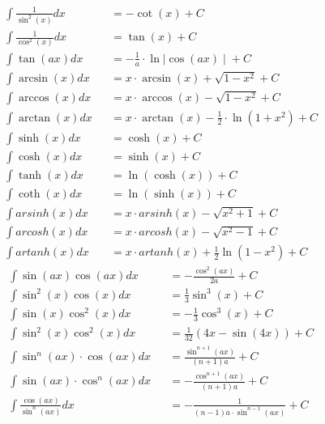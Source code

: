 \begin{small}
\begin{align*}
         & \int \frac{1}{\sin^2(x)}dx     &  & = -\cot(x)+C                                                    \\
         & \int \frac{1}{\cos^2(x)}dx     &  & = \tan(x)+C                                                     \\
         & \int \tan(ax) dx               &  & = -\frac{1}{a} \cdot \ln{\mid \cos(ax) \mid }+C                 \\
         & \int \arcsin (x) dx            &  & = x \cdot \arcsin(x)+\sqrt{1-x^2}+C                             \\
         & \int \arccos (x) dx            &  & = x \cdot \arccos(x)-\sqrt{1-x^2}+C                             \\
         & \int \arctan (x) dx            &  & = x \cdot \arctan(x)-\frac{1}{2} \cdot \ln(1+x^2)+C             \\
         & \int \sinh(x)dx                &  & = \cosh(x)+C                                                    \\
         & \int \cosh(x)dx                &  & = \sinh(x)+C                                                    \\
         & \int \tanh(x)dx                &  & = \ln(\cosh(x)) +C                                              \\
         & \int \coth(x)dx                &  & = \ln(\sinh(x))+C                                               \\
         & \int arsinh(x)dx               &  & = x \cdot arsinh(x) - \sqrt{x^2+1}+C                            \\
         & \int arcosh(x)dx               &  & = x \cdot arcosh(x) - \sqrt{x^2-1}+C                            \\
         & \int artanh(x)dx               &  & = x \cdot artanh(x) +\frac{1}{2}\ln(1-x^2)+C
    \end{align*}
    \begin{align*}
         & \int \sin(ax)\cos(ax) dx           &  & = -\frac{\cos^2(ax)}{2a}+C                 \\
         & \int \sin^2(x)\cos(x)dx            &  & =\frac{1}{3}\sin^3(x)+C                    \\
         & \int \sin(x)\cos^2(x)dx            &  & =-\frac{1}{3}\cos^3(x)+C                   \\
         & \int \sin^2(x)\cos^2(x)dx          &  & =\frac{1}{32}(4x-\sin(4x))+C               \\
         & \int \sin^n(ax)\cdot \cos(ax)dx    &  & =\frac{\sin^{n+1}(ax)}{(n+1)a}+C           \\
         & \int \sin(ax)\cdot \cos^n(ax)dx    &  & =-\frac{\cos^{n+1}(ax)}{(n+1)a}+C          \\
         & \int \frac{\cos(ax)}{\sin^n(ax)}dx &  & = -\frac{1}{(n-1)a \cdot \sin^{n-1}(ax)}+C
    \end{align*}
\end{small}

